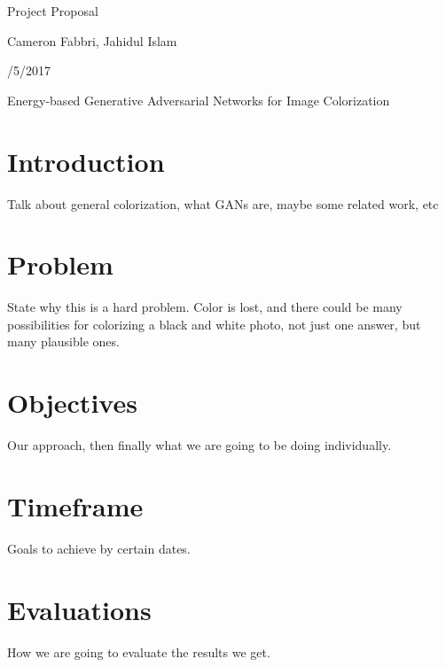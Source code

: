 \documentclass{article}
\begin{document}
\centerline{\sc \large Project Proposal}
\vspace{.5pc}
\centerline{\sc Cameron Fabbri, Jahidul Islam}
\centerline{/5/2017}
\vspace{2pc}

\centerline{\sc \large Energy-based Generative Adversarial Networks for Image Colorization }

\section{Introduction}
Talk about general colorization, what GANs are, maybe some related work, etc

\section{Problem}
State why this is a hard problem. Color is lost, and there could be many possibilities
for colorizing a black and white photo, not just one answer, but many plausible ones.

\section{Objectives}
Our approach, then finally what we are going to be doing individually.

\section{Timeframe}
Goals to achieve by certain dates.


\section{Evaluations}
How we are going to evaluate the results we get.
\end{document}
